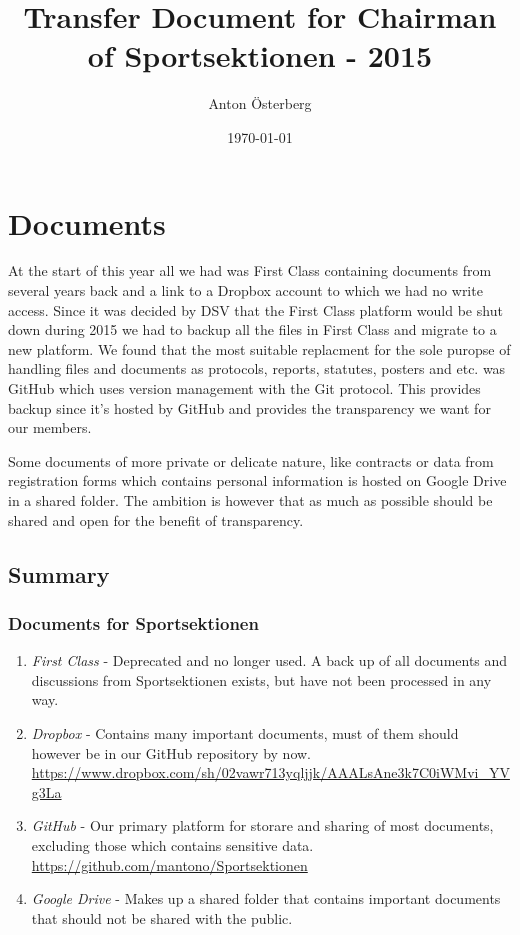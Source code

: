 \documentclass[12pt,a4paper]{article}
\begin{document}
	\title{\Huge Transfer Document for Chairman of Sportsektionen - 2015}
	\author{Anton Österberg}
	\date{\today}

	\maketitle

	\null
	\vfill

	\clearpage

	\section{Documents}
	At the start of this year all we had was First Class containing documents from several years back and a link to a Dropbox account to which we had no write access. Since it was decided by DSV that the First Class platform would be shut down during 2015 we had to backup all the files in First Class and migrate to a new platform. We found that the most suitable replacment for the sole puropse of handling files and documents as protocols, reports, statutes, posters and etc. was GitHub which uses version management with the Git protocol. This provides backup since it's hosted by GitHub and provides the transparency we want for our members.

	Some documents of more private or delicate nature, like contracts or data from registration forms which contains personal information is hosted on Google Drive in a shared folder. The ambition is however that as much as possible should be shared and open for the benefit of transparency.

		\subsection{Summary}
		\subsubsection{Documents for Sportsektionen}

		\begin{enumerate}
			\item \emph{First Class} - Deprecated and no longer used. A back up of all documents and discussions from Sportsektionen exists, but have not been processed in any way.
			\item \emph{Dropbox} - Contains many important documents, must of them should however be in our GitHub repository by now.\\
			\url{https://www.dropbox.com/sh/02vawr713yqljjk/AAALsAne3k7C0iWMvi_YVg3La}
			\item \emph{GitHub} - Our primary platform for storare and sharing of most documents, excluding those which contains sensitive data.\\
			\url{https://github.com/mantono/Sportsektionen}
			\item \emph{Google Drive} - Makes up a shared folder that contains important documents that should not be shared with the public.
		\end{enumerate}
\end{document}
